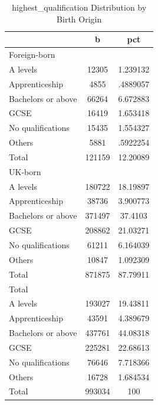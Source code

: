\documentclass[12pt, a4paper]{article}
\begin{document}
\begin{table}[H]\centering
\def\sym#1{\ifmmode^{#1}\else\(^{#1}\)\fi}
\begin{tabularx}{\textwidth}{@{}lCC@{}}
\hline\hline
                    &           b&         pct\\
\hline
Foreign-born        &            &            \\
A levels            &       12305&    1.239132\\
Apprenticeship      &        4855&    .4889057\\
Bachelors or above  &       66264&    6.672883\\
GCSE                &       16419&    1.653418\\
No qualifications   &       15435&    1.554327\\
Others              &        5881&    .5922254\\
Total               &      121159&    12.20089\\
\hline
UK-born             &            &            \\
A levels            &      180722&    18.19897\\
Apprenticeship      &       38736&    3.900773\\
Bachelors or above  &      371497&     37.4103\\
GCSE                &      208862&    21.03271\\
No qualifications   &       61211&    6.164039\\
Others              &       10847&    1.092309\\
Total               &      871875&    87.79911\\
\hline
Total               &            &            \\
A levels            &      193027&    19.43811\\
Apprenticeship      &       43591&    4.389679\\
Bachelors or above  &      437761&    44.08318\\
GCSE                &      225281&    22.68613\\
No qualifications   &       76646&    7.718366\\
Others              &       16728&    1.684534\\
Total               &      993034&         100\\
\hline\hline
\end{tabularx}
\caption{highest\_qualification Distribution by Birth Origin}
\end{table}
\end{document}
